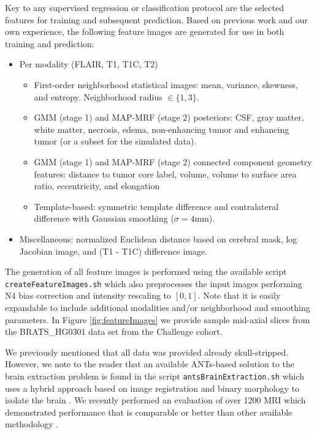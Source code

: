 \documentclass[final,5p,times,twocolumn]{elsarticle}
\begin{document}
Key to any supervised regression or classification protocol are the 
selected features for training and subsequent prediction.  Based on previous
work and our own experience, the following feature images are generated
for use in both training and prediction:
\begin{itemize}
  \item Per modality (FLAIR, T1, T1C, T2)
    \begin{itemize}
      \item First-order neighborhood statistical images:
            mean, variance, skewness, and entropy. 
            Neighborhood radius $\in \{1,3\}$.
    \item GMM (stage 1) and MAP-MRF (stage 2) posteriors: CSF, gray matter, white 
          matter, necrosis, edema, non-enhancing tumor and enhancing tumor (or a
          subset for the simulated data).
    \item GMM (stage 1) and MAP-MRF (stage 2) connected component geometry 
          features:  distance to tumor core label, volume, volume to surface area ratio, eccentricity, and elongation
    \item Template-based:  symmetric template difference and 
          contralateral difference with Gaussian smoothing ($\sigma = 4$mm).
    \end{itemize}
  \item Miscellaneous: normalized Euclidean distance based on cerebral mask,
    log Jacobian image, and  (T1 - T1C) difference image.
\end{itemize}
The generation of all feature images is performed using the available script 
{\tt createFeatureImages.sh} which also preprocesses the input images performing N4
bias correction \citep{tustison2010} and intensity rescaling to $[0,1]$.  Note that 
it is easily expandable to include 
additional modalities and/or neighborhood and smoothing parameters.
In Figure \ref{fig:featureImages}
we provide sample mid-axial slices from the BRATS\_HG0301
data set from the Challenge cohort.  

We previously mentioned that all data was provided already 
skull-stripped.  However, we note to the reader that an
available ANTs-based solution to the brain extraction problem
is found in the script {\tt antsBrainExtraction.sh} which uses
a hybrid approach based on image registration and binary morphology
to isolate the brain \cite{avants2010a}.  We recently performed an evaluation of over 1200
MRI which demonstrated performance that is comparable or better than
other available methodology \cite{tustison2013a}.
\end{document}
